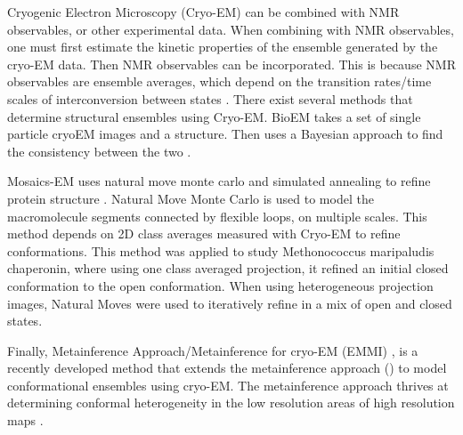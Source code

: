 \documentclass{article}
\begin{document}
Cryogenic Electron Microscopy (Cryo-EM) can be combined with NMR observables, or other experimental data. When combining with NMR observables, one must first estimate the kinetic properties of the ensemble generated by the cryo-EM data. Then NMR observables can be incorporated.
This is because NMR observables are ensemble averages, which depend on the transition rates/time scales of interconversion between states \cite{bonomiDeterminationProteinStructural2019}. 
There exist several methods that determine structural ensembles using Cryo-EM.  
BioEM takes a set of single particle cryoEM images and a structure. Then uses a Bayesian approach to find the consistency between the two \cite{cossioBayesianAnalysisIndividual2013} .

Mosaics-EM \cite{zhangMultiscaleNaturalMoves2012} uses natural move monte carlo and simulated annealing to refine protein structure \cite{kirkpatrickOptimizationSimulatedAnnealing1983}.  Natural Move Monte Carlo is used to model the macromolecule segments connected by flexible loops, on multiple scales. 
This method depends on 2D class averages measured with Cryo-EM to refine conformations.
This method was applied to study Methonococcus maripaludis chaperonin, where using one class averaged projection, it refined an initial closed conformation to the open conformation. 
When using heterogeneous projection images, Natural Moves were used to iteratively refine in a mix of open and closed states.

Finally, Metainference Approach/Metainference for cryo-EM (EMMI) \cite{bonomiSimultaneousDeterminationProtein2018},\cite{bonomiBayesianWeighingElectron2019} is a recently developed method that extends the metainference approach (\cite{bonomiMetainferenceBayesianInference2016}) to model conformational ensembles using cryo-EM. The metainference approach thrives at determining conformal heterogeneity in the low resolution areas of high resolution maps \cite{bonomiMetainferenceBayesianInference2016}.
  



\printbibliography
\end{document}
